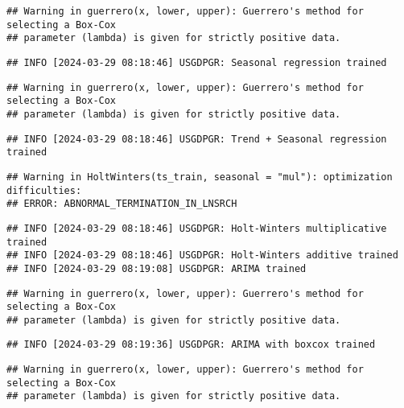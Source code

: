 \documentclass[
]{article}
\begin{document}
\begin{verbatim}
## Warning in guerrero(x, lower, upper): Guerrero's method for selecting a Box-Cox
## parameter (lambda) is given for strictly positive data.
\end{verbatim}

\begin{verbatim}
## INFO [2024-03-29 08:18:46] USGDPGR: Seasonal regression trained
\end{verbatim}

\begin{verbatim}
## Warning in guerrero(x, lower, upper): Guerrero's method for selecting a Box-Cox
## parameter (lambda) is given for strictly positive data.
\end{verbatim}

\begin{verbatim}
## INFO [2024-03-29 08:18:46] USGDPGR: Trend + Seasonal regression trained
\end{verbatim}

\begin{verbatim}
## Warning in HoltWinters(ts_train, seasonal = "mul"): optimization difficulties:
## ERROR: ABNORMAL_TERMINATION_IN_LNSRCH
\end{verbatim}

\begin{verbatim}
## INFO [2024-03-29 08:18:46] USGDPGR: Holt-Winters multiplicative trained
## INFO [2024-03-29 08:18:46] USGDPGR: Holt-Winters additive trained
## INFO [2024-03-29 08:19:08] USGDPGR: ARIMA trained
\end{verbatim}

\begin{verbatim}
## Warning in guerrero(x, lower, upper): Guerrero's method for selecting a Box-Cox
## parameter (lambda) is given for strictly positive data.
\end{verbatim}

\begin{verbatim}
## INFO [2024-03-29 08:19:36] USGDPGR: ARIMA with boxcox trained
\end{verbatim}

\begin{verbatim}
## Warning in guerrero(x, lower, upper): Guerrero's method for selecting a Box-Cox
## parameter (lambda) is given for strictly positive data.
\end{verbatim}
\end{document}
